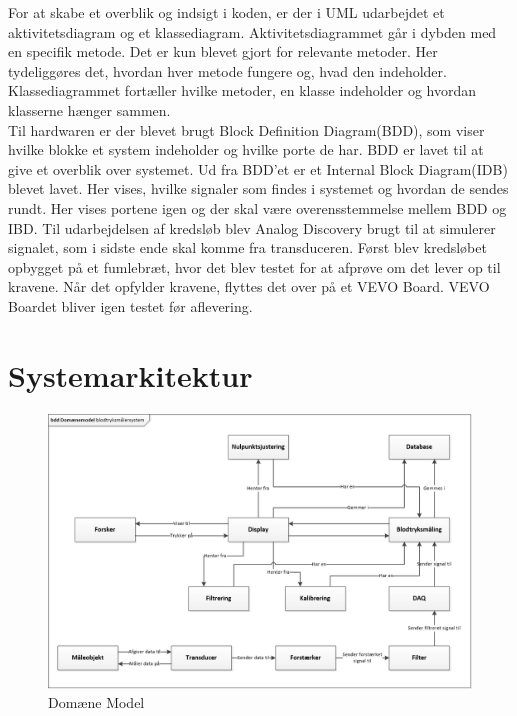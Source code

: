 \newline 
For at skabe et overblik og indsigt i koden, er der i UML udarbejdet et aktivitetsdiagram og et klassediagram. Aktivitetsdiagrammet går i dybden med en specifik metode. Det er kun blevet gjort for relevante metoder. Her tydeliggøres det, hvordan hver metode fungere og, hvad den indeholder.  Klassediagrammet fortæller hvilke metoder, en klasse indeholder og hvordan klasserne hænger sammen.\\
\newline  
Til hardwaren er der blevet brugt Block Definition Diagram(BDD), som viser hvilke blokke et system indeholder og hvilke porte de har. BDD er lavet til at give et overblik over systemet. Ud fra BDD’et er et Internal Block Diagram(IDB) blevet lavet. Her vises, hvilke signaler som findes i systemet og hvordan de sendes rundt. Her vises portene igen og der skal være overensstemmelse  mellem BDD og IBD.    
\newline 
Til udarbejdelsen af kredsløb blev Analog Discovery brugt til at simulerer signalet, som i sidste ende skal komme fra transduceren. Først blev kredsløbet opbygget på et fumlebræt, hvor det blev testet for at afprøve om det lever op til kravene. Når det opfylder kravene, flyttes det over på et VEVO Board. VEVO Boardet bliver igen testet før aflevering. 

\section{Systemarkitektur}

\begin{figure}[H]
	\centering
	\includegraphics[width=1.0\textwidth]{Figurer/DomaneModel}
	\caption{Domæne Model}
	\label{fig:Domaene Model}
\end{figure}

